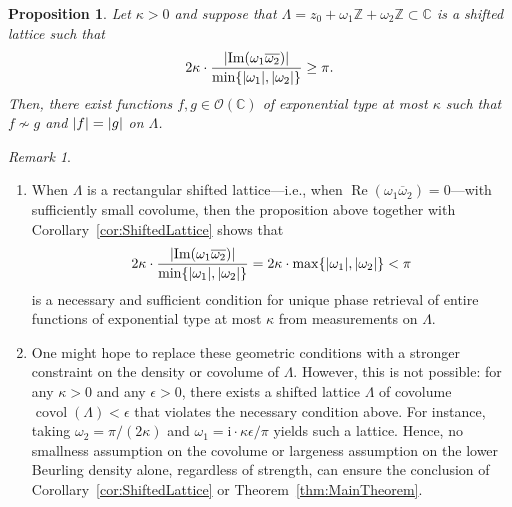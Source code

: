 \documentclass{article}
\newcommand{\bbC}{\mathbb{C}}
\newcommand{\bbZ}{\mathbb{Z}}
\newcommand{\calO}{\mathcal{O}}
\newcommand{\rmi}{\mathrm{i}}
\DeclarePairedDelimiter{\abs}{\lvert}{\rvert}
\renewcommand{\Re}{\operatorname{Re}}
\renewcommand{\Im}{\operatorname{Im}}
\newtheorem{proposition}{Proposition}
\theoremstyle{remark}
\newtheorem{remark}{Remark}
\begin{document}
    \begin{proposition}
        Let $\kappa > 0$ and suppose that $\Lambda = z_0 + \omega_1 \bbZ + \omega_2 \bbZ \subset \mathbb{C}$ is a shifted lattice such that
        \begin{equation*}
            2 \kappa \cdot \frac{\abs{\Im(\omega_1 \overline{\omega_2})}}{\min\lbrace \abs{\omega_1}, \abs{\omega_2} \rbrace} \geq \pi.
        \end{equation*}
        Then, there exist functions $f, g \in \calO(\bbC)$ of exponential type at most $\kappa$ such that $f \not\sim g$ and $\abs{f} = \abs{g}$ on $\Lambda$.
    \end{proposition}

    \begin{remark}
        \begin{enumerate}
            \item When $\Lambda$ is a rectangular shifted lattice---i.e., when $\Re(\omega_1 \overline \omega_2) = 0$---with sufficiently small covolume, then the proposition above together with Corollary~\ref{cor:ShiftedLattice} shows that 
            \begin{equation*}
                2 \kappa \cdot \frac{\abs{\Im(\omega_1 \overline{\omega_2})}}{\min\lbrace \abs{\omega_1}, \abs{\omega_2} \rbrace} = 2 \kappa \cdot \max\lbrace \abs{\omega_1}, \abs{\omega_2} \rbrace < \pi
            \end{equation*}
            is a necessary and sufficient condition for unique phase retrieval of entire functions of exponential type at most $\kappa$ from measurements on $\Lambda$.
            \item One might hope to replace these geometric conditions with a stronger constraint on the density or covolume of $\Lambda$. However, this is not possible: for any $\kappa > 0$ and any $\epsilon > 0$, there exists a shifted lattice $\Lambda$ of covolume $\operatorname{covol}(\Lambda) < \epsilon$ that violates the necessary condition above. For instance, taking $\omega_2 = \pi/(2\kappa)$ and $\omega_1 = \rmi \cdot \kappa\epsilon/\pi$ yields such a lattice. Hence, no smallness assumption on the covolume or largeness assumption on the lower Beurling density alone, regardless of strength, can ensure the conclusion of Corollary~\ref{cor:ShiftedLattice} or Theorem~\ref{thm:MainTheorem}.
        \end{enumerate}
    \end{remark}
\end{document}
